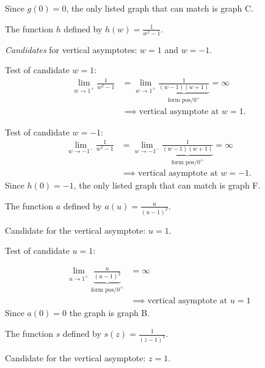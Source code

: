 \documentclass[nooutcomes]{ximera}
\renewenvironment{freeResponse}{
\ifhandout\setbox0\vbox\bgroup\else
\begin{trivlist}\item[\hskip \labelsep\bfseries Solution:\hspace{2ex}]
\fi}
{\ifhandout\egroup\else
\end{trivlist}
\fi}
\begin{document}
\begin{problem}
\begin{enumerate}
\begin{freeResponse}
        Since $g(0) = 0$, the only listed graph that can match is graph C.
      \end{freeResponse}


    \item 
      The function $h$ defined by $\displaystyle h(w) = \frac{1}{w^2 -1}$.
      \begin{freeResponse}
        \emph{Candidates} for vertical asymptotes: $w = 1$ and $w = -1$.

        Test of candidate $w = 1$:
        \begin{align*}
          \lim_{w \to 1^+} \frac{1}{w^2 -1} &= \lim_{w \to 1^+} \underbrace{\frac{1}{(w-1)(w+1)}}_{\text{form $\text{pos}/0^+$}} = \infty\\
          &\implies \mbox{vertical asymptote at $w = 1$}.
        \end{align*}

        Test of candidate $w = -1$:
        \begin{align*}
          \lim_{w \to -1^-} \frac{1}{w^2 -1} &= \lim_{w \to -1^-} \underbrace{\frac{1}{(w-1)(w+1)}}_{\text{form $\text{pos}/0^+$}} = \infty\\
          &\implies \mbox{vertical asymptote at $w = -1$}.
        \end{align*}
        Since $h(0) = -1$, the only listed graph that can match is graph F.
      \end{freeResponse}

    \item 
      The function $a$ defined by $\displaystyle a(u) = \frac{u}{(u-1)^2}$.
      \begin{freeResponse}
        Candidate for the vertical asymptote: $u = 1$.

        Test of candidate $u = 1$:

        \begin{align*}
          \lim_{u \to 1^+} \underbrace{\frac{u}{(u-1)^2}}_{\text{form $\text{pos}/0^+$}} &= \infty \\
          &\implies \mbox{vertical asymptote at $u = 1$}
        \end{align*}
        Since $a(0) = 0$ the graph is graph B.
      \end{freeResponse}

    \item 
      The function $s$ defined by $\displaystyle s(z) = \frac{1}{(z-1)^2}$.
      \begin{freeResponse}
        Candidate for the vertical asymptote: $z = 1$.


\end{freeResponse}
\end{enumerate}
\end{problem}
\end{document}
